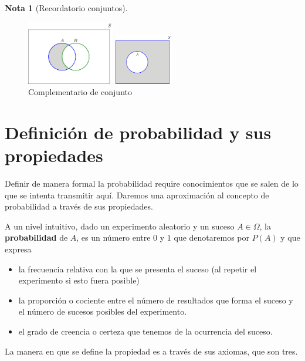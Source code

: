 \documentclass[]{book}
\theoremstyle{plain}
\theoremstyle{definition}
\newtheorem{note}[theorem]{Nota}
\theoremstyle{definition} %
\begin{document}
\begin{note}[Recordatorio conjuntos]
\begin{figure}[htbp]
      \begin{minipage}{0.5\linewidth}
      \centering
      \includegraphics[width=1.5in,height=\textheight]{img/difference_b.png}
      \caption{Resta de conjuntos}
      \end{minipage}%
      \begin{minipage}{0.5\linewidth}
      \centering
      \includegraphics[width=1in,height=\textheight]{img/complement_b.png}
      \caption{Complementario de conjunto}
      \end{minipage}
    \end{figure} 
\end{note}


\newpage
\section{Definición de probabilidad y sus propiedades}

Definir de manera formal la probabilidad require conocimientos que se salen de lo que se intenta transmitir aquí. Daremos una aproximación
al concepto de probabilidad a través de sus propiedades.

A un nivel intuitivo, dado un experimento aleatorio y un suceso $A\in \Omega$, la \textbf{probabilidad} de $A$,
es un número entre $0$ y $1$ que denotaremos por $P(A)$ y que expresa 
\begin{itemize}
  \item la frecuencia relativa con la que se presenta el suceso (al repetir el experimento si esto fuera posible)
  \item la proporción o cociente entre el número de resultados que forma el suceso y el número de sucesos posibles del experimento.
  \item el grado de creencia o certeza que tenemos de la ocurrencia del suceso.
\end{itemize}

La manera en que se define la propiedad es a través de sus axiomas, que son tres. 
\end{document}
